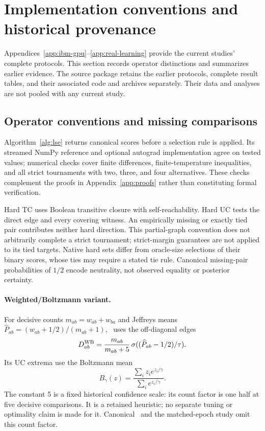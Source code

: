 \section{Implementation conventions and historical provenance}\label{app:implementation-provenance}\label{app:implementation}\label{app:historical-overview}
Appendices~\ref{app:ibm-gpu}--\ref{app:real-learning} provide the current studies' complete protocols. This section records operator distinctions and summarizes earlier evidence. The source package retains the earlier protocols, complete result tables, and their associated code and archives separately. Their data and analyses are not pooled with any current study.

\subsection{Operator conventions and missing comparisons}
Algorithm~\ref{alg:lse} returns canonical scores before a selection rule is applied. Its streamed NumPy reference and optional autograd implementation agree on tested values; numerical checks cover finite differences, finite-temperature inequalities, and all strict tournaments with two, three, and four alternatives. These checks complement the proofs in Appendix~\ref{app:proofs} rather than constituting formal verification.

Hard TC uses Boolean transitive closure with self-reachability. Hard UC tests the direct edge and every covering witness. An empirically missing or exactly tied pair contributes neither hard direction. This partial-graph convention does not arbitrarily complete a strict tournament; strict-margin guarantees are not applied to its tied targets. Native hard sets differ from oracle-size selections of their binary scores, whose ties may require a stated tie rule. Canonical missing-pair probabilities of $1/2$ encode neutrality, not observed equality or posterior certainty.

\paragraph{Weighted/Boltzmann variant.}\label{app:variant-details}
For decisive counts $m_{ab}=w_{ab}+w_{ba}$ and Jeffreys means $\widehat P_{ab}=(w_{ab}+1/2)/(m_{ab}+1)$, \WB\ uses the off-diagonal edges
\begin{equation}\label{eq:weighted}
 D^{\rm WB}_{ab}=\frac{m_{ab}}{m_{ab}+5}\,\sigma((\widehat P_{ab}-1/2)/\tau).
\end{equation}
Its UC extrema use the Boltzmann mean
\begin{equation}\label{eq:boltzmann}
 B_\gamma(z)=\frac{\sum_i z_i e^{z_i/\gamma}}{\sum_i e^{z_i/\gamma}}.
\end{equation}
The constant 5 is a fixed historical confidence scale: its count factor is one half at five decisive comparisons. It is a retained heuristic; no separate tuning or optimality claim is made for it. Canonical \LSE\ and the matched-epoch study omit this count factor.


